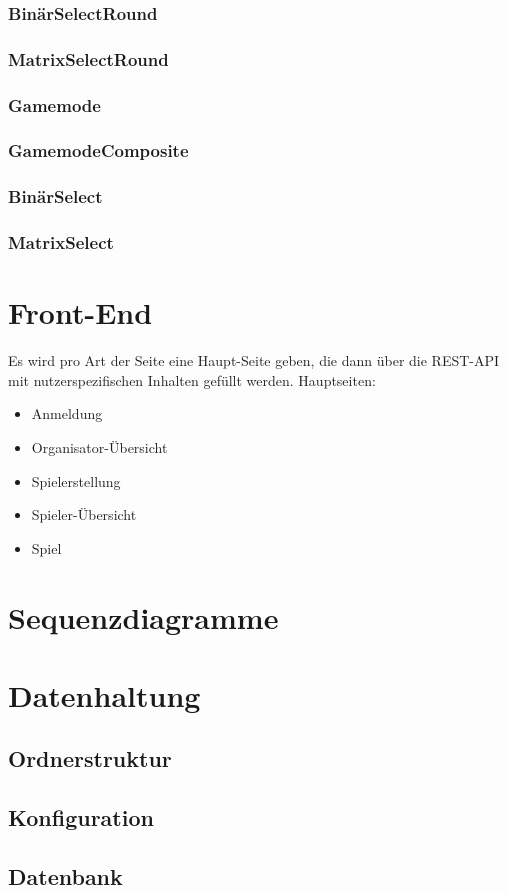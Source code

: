 \documentclass[a4paper]{scrreprt}
\begin{document}
   \subsection{BinärSelectRound}
   
   \subsection{MatrixSelectRound}
   
   
   \subsection{Gamemode}
   
   \subsection{GamemodeComposite}
   
   \subsection{BinärSelect}
   
   \subsection{MatrixSelect}
   

   
   
   
	

    \chapter{Front-End}
    Es wird pro Art der Seite eine Haupt-Seite geben, die dann über die REST-API mit nutzerspezifischen Inhalten gefüllt werden.
    Hauptseiten:
    \begin{itemize}
    \item   Anmeldung
    \item   Organisator-Übersicht
    \item   Spielerstellung
    \item   Spieler-Übersicht
    \item   Spiel
    \end{itemize}
   \chapter{Sequenzdiagramme}

    \chapter{Datenhaltung}
        \section{Ordnerstruktur}
        \section{Konfiguration}
        \section{Datenbank}
\end{document}
